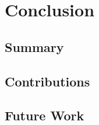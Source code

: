 \chapter{Conclusion}\label{conclusion}

\section{Summary}

\section{Contributions}

\section{Future Work}